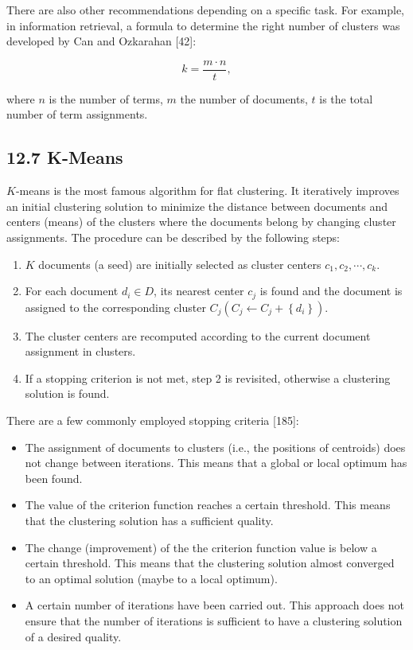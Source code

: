 \documentclass[10pt]{book}
\begin{document}
There are also other recommendations depending on a specific task. For example, in information retrieval, a formula to determine the right number of clusters was developed by Can and Ozkarahan [42]:


\begin{equation*}
k=\frac{m \cdot n}{t}, \tag{12.24}
\end{equation*}


where $n$ is the number of terms, $m$ the number of documents, $t$ is the total number of term assignments.

\subsection*{12.7 K-Means}
$K$-means is the most famous algorithm for flat clustering. It iteratively improves an initial clustering solution to minimize the distance between documents and centers (means) of the clusters where the documents belong by changing cluster assignments. The procedure can be described by the following steps:

\begin{enumerate}
  \item $K$ documents (a seed) are initially selected as cluster centers $c_{1}, c_{2}, \cdots, c_{k}$.
  \item For each document $d_{i} \in D$, its nearest center $c_{j}$ is found and the document is assigned to the corresponding cluster $C_{j}\left(C_{j} \leftarrow C_{j}+\left\{d_{i}\right\}\right)$.
  \item The cluster centers are recomputed according to the current document assignment in clusters.
  \item If a stopping criterion is not met, step 2 is revisited, otherwise a clustering solution is found.
\end{enumerate}

There are a few commonly employed stopping criteria [185]:

\begin{itemize}
  \item The assignment of documents to clusters (i.e., the positions of centroids) does not change between iterations. This means that a global or local optimum has been found.
  \item The value of the criterion function reaches a certain threshold. This means that the clustering solution has a sufficient quality.
  \item The change (improvement) of the the criterion function value is below a certain threshold. This means that the clustering solution almost converged to an optimal solution (maybe to a local optimum).
  \item A certain number of iterations have been carried out. This approach does not ensure that the number of iterations is sufficient to have a clustering solution of a desired quality.
\end{itemize}
\end{document}
